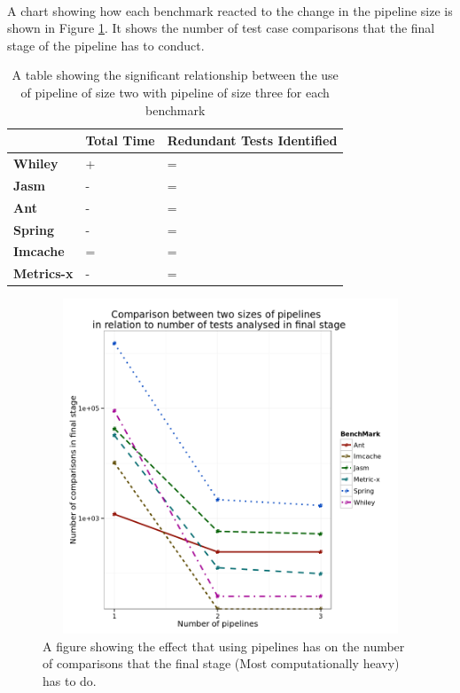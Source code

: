 \paragraph{}
A chart showing how each benchmark reacted to the change in the pipeline size is shown in Figure \ref{fig:pipelinegraph}. It shows the number of test case comparisons that the final stage of the pipeline has to conduct.

\begin{table}[h]
\centering


\begin{tabular}{|l|l|l|}
\hline
{\bf }          & {\bf Total Time} & {\bf Redundant Tests Identified} \\ \hline
{\bf Whiley}    & +                & =                           \\ \hline
{\bf Jasm}      & -                & =                           \\ \hline
{\bf Ant}       & -                & =                           \\ \hline
{\bf Spring}    & -                & =                           \\ \hline
{\bf Imcache}   & =                & =                           \\ \hline
{\bf Metrics-x} & -                & =                           \\ \hline
\end{tabular}
\caption{A table showing the significant relationship between the use of pipeline of size two with pipeline of size three for each benchmark}
\label{pipelinesig}
\end{table}

\begin{figure}[h]
\begin{center}
\includegraphics[height=10cm, width = 14.5cm]{Pipeline.png}
\end{center}
\caption{A figure showing the effect that using pipelines has on the number of comparisons that the final stage (Most computationally heavy) has to do.}
\label{fig:pipelinegraph}
\end{figure}



